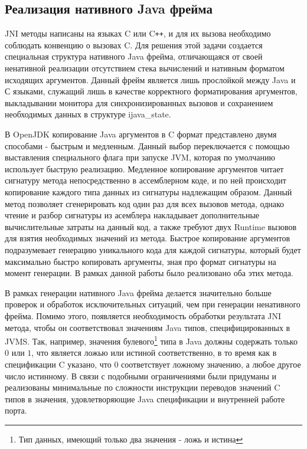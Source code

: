 \subsection{Реализация нативного Java фрейма}
JNI методы написаны на языках C или C\texttt{++}, и для их вызова необходимо соблюдать конвенцию о вызовах C. Для решения этой задачи создается специальная структура нативного Java фрейма, отличающаяся от своей ненативной реализации отсутствием стека вычислений и нативным форматом исходящих аргументов. Данный фрейм является лишь прослойкой между Java и С языками, служащий лишь в качестве корректного форматирования аргументов, выкладывании монитора для синхронизированных вызовов и сохранением необходимых данных в структуре ijava\_state.




В OpenJDK копирование Java аргументов в C формат представлено двумя способами - быстрым и медленным. Данный выбор переключается с помощью выставления специального флага при запуске JVM, которая по умолчанию использует быструю реализацию. Медленное копирование аргументов читает сигнатуру метода непосредственно в ассемблерном коде, и по ней происходит копирование каждого типа данных из сигнатуры надлежащим образом. Данный метод позволяет сгенерировать код один раз для всех вызовов метода, однако чтение и разбор сигнатуры из асемблера накладывает дополнительные вычислительные затраты на данный код, а также требуют двух Runtime вызовов для взятия необходимых значений из метода. Быстрое копирование аргументов подразумевает генерацию уникального кода для каждой сигнатуры, который будет максимально быстро копировать аргументы, зная про формат сигнатуры на момент генерации. В рамках данной работы было реализовано оба этих метода.

В рамках генерации нативного Java фрейма делается значительно больше проверок и обработок исключительных ситуаций, чем при генерации ненативного фрейма. Помимо этого, появляется необходимость обработки результата JNI метода, чтобы он соответствовал значениям Java типов, специфицированных в JVMS. Так, например, значения булевого\footnote{Тип данных, имеющий только два значения - ложь и истина} типа в Java должны содержать только $0$ или $1$, что является ложью или истиной соответственно, в то время как в спецификации C указано, что $0$ соответствует ложному значению, а любое другое число истинному. В связи с подобными ограничениями были придуманы и реализованы минимальные по сложности инструкции переводов значений C типов в значения, удовлетворяющие Java спецификации и внутренней работе порта.



